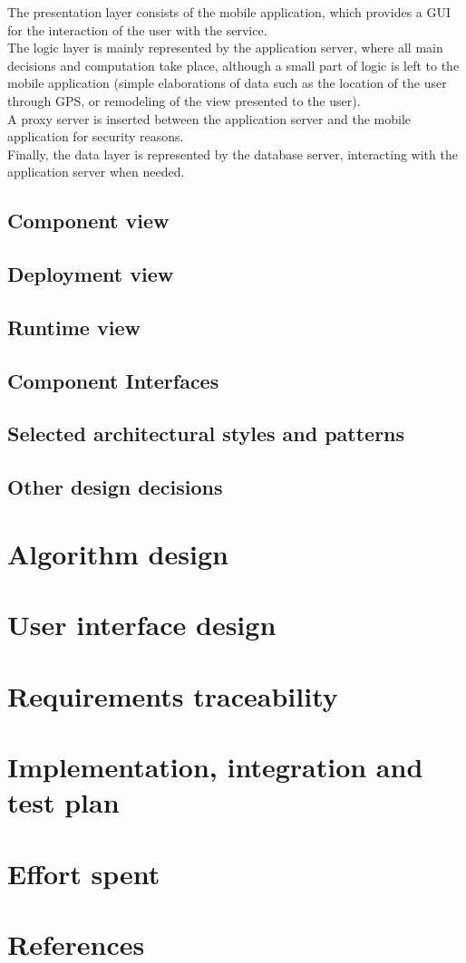\documentclass[a4paper,leqno]{article}
\begin{document}
The presentation layer consists of the mobile application, which provides a GUI for the interaction of the user with the service.\\
The logic layer is mainly represented by the application server, where all main decisions and computation take place, although a small part of logic is left to the mobile application (simple elaborations of data such as the location of the user through GPS, or remodeling of the view presented to the user).\\
A proxy server is inserted between the application server and the mobile application for security reasons.\\
Finally, the data layer is represented by the database server, interacting with the application server when needed.

\subsection{Component view}
\subsection{Deployment view}
\subsection{Runtime view}
\subsection{Component Interfaces}
\subsection{Selected architectural styles and patterns}
\subsection{Other design decisions}

\newpage
\section{Algorithm design}

\newpage
\section{User interface design}

\newpage
\section{Requirements traceability}

\newpage
\section{Implementation, integration and test plan}

\newpage
\section{Effort spent}

\newpage
\section{References}
	
\end{document}
